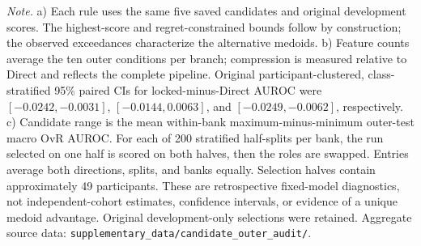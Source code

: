 \begin{table}[p]
\medskip
\parbox{0.98\linewidth}{\footnotesize
\textit{Note.} a) Each rule uses the same five saved candidates and original development scores. The highest-score and regret-constrained bounds follow by construction; the observed exceedances characterize the alternative medoids. b) Feature counts average the ten outer conditions per branch; compression is measured relative to Direct and reflects the complete pipeline. Original participant-clustered, class-stratified 95\% paired CIs for locked-minus-Direct AUROC were $[-0.0242,-0.0031]$, $[-0.0144,0.0063]$, and $[-0.0249,-0.0062]$, respectively. c) Candidate range is the mean within-bank maximum-minus-minimum outer-test macro OvR AUROC. For each of 200 stratified half-splits per bank, the run selected on one half is scored on both halves, then the roles are swapped. Entries average both directions, splits, and banks equally. Selection halves contain approximately 49 participants. These are retrospective fixed-model diagnostics, not independent-cohort estimates, confidence intervals, or evidence of a unique medoid advantage. Original development-only selections were retained. Aggregate source data: \texttt{supplementary\_data/candidate\_outer\_audit/}.}
\end{table}
